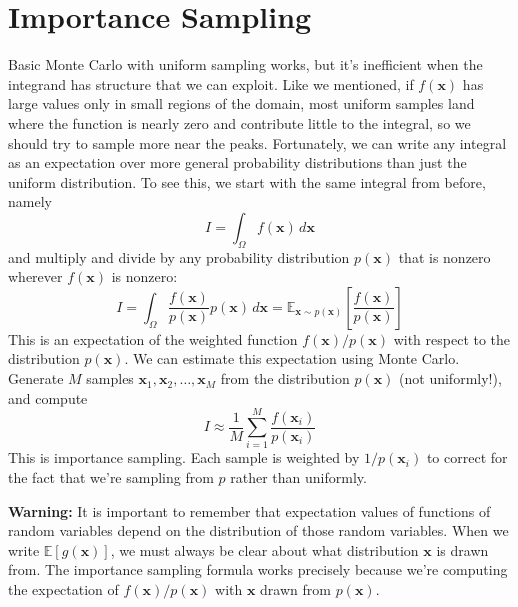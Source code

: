 \section{Importance Sampling}
Basic Monte Carlo with uniform sampling works, but it's inefficient when the integrand has structure that we can exploit. Like we mentioned, if $f(\mathbf{x})$ has large values only in small regions of the domain, most uniform samples land where the function is nearly zero and contribute little to the integral, so we should try to sample more near the peaks. Fortunately, we can write any integral as an expectation over more general probability distributions than just the uniform distribution. To see this, we start with the same integral from before, namely
\begin{equation}
    I = \int_{\Omega} f(\mathbf{x}) \, d\mathbf{x}
\end{equation}
and multiply and divide by any probability distribution $p(\mathbf{x})$ that is nonzero wherever $f(\mathbf{x})$ is nonzero:
\begin{equation}
    I = \int_{\Omega} \frac{f(\mathbf{x})}{p(\mathbf{x})} p(\mathbf{x}) \, d\mathbf{x} = \mathbb{E}_{\mathbf{x} \sim p(\mathbf{x})} \left[ \frac{f(\mathbf{x})}{p(\mathbf{x})} \right]
\end{equation}
This is an expectation of the weighted function $f(\mathbf{x})/p(\mathbf{x})$ with respect to the distribution $p(\mathbf{x})$. We can estimate this expectation using Monte Carlo. Generate $M$ samples $\mathbf{x}_1, \mathbf{x}_2, \ldots, \mathbf{x}_M$ from the distribution $p(\mathbf{x})$ (not uniformly!), and compute
\begin{equation}
    I \approx \frac{1}{M} \sum_{i=1}^{M} \frac{f(\mathbf{x}_i)}{p(\mathbf{x}_i)}
\end{equation}
This is importance sampling. Each sample is weighted by $1/p(\mathbf{x}_i)$ to correct for the fact that we're sampling from $p$ rather than uniformly.

\begin{warningBox}
    \textbf{Warning:} It is important to remember that expectation values of functions of random variables depend on the distribution of those random variables. When we write $\mathbb{E}[g(\mathbf{x})]$, we must always be clear about what distribution $\mathbf{x}$ is drawn from. The importance sampling formula works precisely because we're computing the expectation of $f(\mathbf{x})/p(\mathbf{x})$ with $\mathbf{x}$ drawn from $p(\mathbf{x})$.
\end{warningBox}


